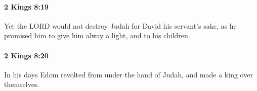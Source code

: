 		\paragraph{2 Kings 8:19} %
			\label{2KINGS-8-19}

			Yet the LORD would not destroy Judah for David his servant’s sake, as he promised him to give him alway a light, and to his children.


		\paragraph{2 Kings 8:20} %
			\label{2KINGS-8-20}

			In his days Edom revolted from under the hand of Judah, and made a king over themselves.


